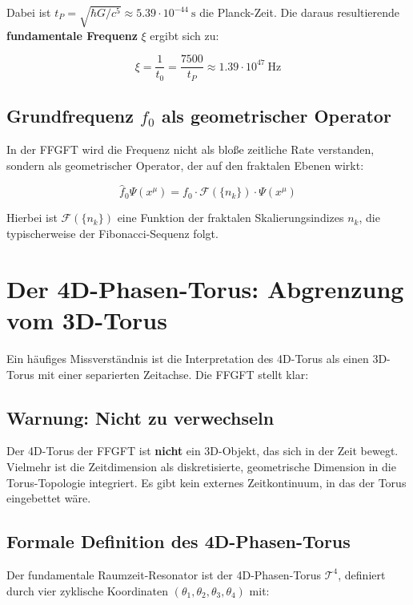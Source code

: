 	Dabei ist $t_P = \sqrt{\hbar G/c^5} \approx 5.39 \cdot 10^{-44}~\text{s}$ die Planck-Zeit. Die daraus resultierende \textbf{fundamentale Frequenz} $\xi$ ergibt sich zu:
	
	\begin{equation}
		\xi = \frac{1}{t_0} = \frac{7500}{t_P} \approx 1.39 \cdot 10^{47}~\text{Hz}
	\end{equation}
	
	\subsection{Grundfrequenz $f_0$ als geometrischer Operator}
	
	In der FFGFT wird die Frequenz nicht als bloße zeitliche Rate verstanden, sondern als geometrischer Operator, der auf den fraktalen Ebenen wirkt:
	
	\begin{equation}
		\hat{f}_0 \Psi(x^\mu) = f_0 \cdot \mathcal{F}(\{n_k\}) \cdot \Psi(x^\mu)
	\end{equation}
	
	Hierbei ist $\mathcal{F}(\{n_k\})$ eine Funktion der fraktalen Skalierungsindizes $n_k$, die typischerweise der Fibonacci-Sequenz folgt.
	
	\section{Der 4D-Phasen-Torus: Abgrenzung vom 3D-Torus}
	
	Ein häufiges Missverständnis ist die Interpretation des 4D-Torus als einen 3D-Torus mit einer separierten Zeitachse. Die FFGFT stellt klar:
	
	\subsection{Warnung: Nicht zu verwechseln}
	
	Der 4D-Torus der FFGFT ist \textbf{nicht} ein 3D-Objekt, das sich in der Zeit bewegt. Vielmehr ist die Zeitdimension als diskretisierte, geometrische Dimension in die Torus-Topologie integriert. Es gibt kein externes Zeitkontinuum, in das der Torus eingebettet wäre.
	
	\subsection{Formale Definition des 4D-Phasen-Torus}
	
	Der fundamentale Raumzeit-Resonator ist der 4D-Phasen-Torus $\mathcal{T}^4$, definiert durch vier zyklische Koordinaten $(\theta_1, \theta_2, \theta_3, \theta_4)$ mit:
	
